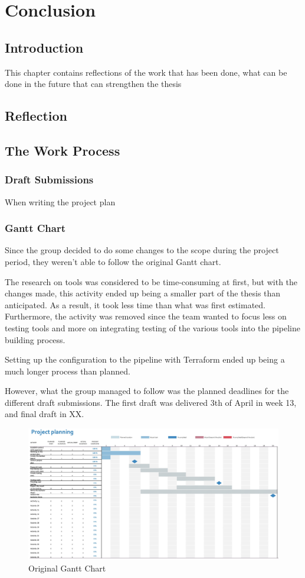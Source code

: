 \chapter{Conclusion}
\section{Introduction}
This chapter contains reflections of the work that has been done, what can be done in the future that can strengthen the thesis

\section{Reflection}


\section{The Work Process}

\subsection{Draft Submissions}
When writing the project plan 


\subsection{Gantt Chart}
Since the group decided to do some changes to the scope during the project period, they weren't able to follow the original Gantt chart. 

The research on tools was considered to be time-consuming at first, but with the changes made, this activity ended up being a smaller part of the thesis than anticipated. As a result, it took less time than what was first estimated. Furthermore, the activity was removed since the team wanted to focus less on testing tools and more on integrating testing of the various tools into the pipeline building process. 

Setting up the configuration to the pipeline with Terraform  ended up being a much longer process than planned. 

However, what the group managed to follow was the planned deadlines for the different draft submissions. The first draft was delivered 3th of April in week 13, and final draft in XX.

\vspace{2mm}
\begin{figure}[H]
    \centering
    \includegraphics[width=0.8\columnwidth]{Images/gantt2.jpg}
    \caption{Original Gantt Chart}
    \label{fig: Original Gantt Chart}
\end{figure}

